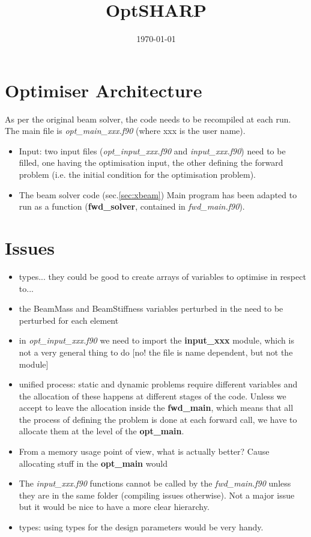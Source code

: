 \documentclass[a4paper,10pt]{article}
\title{OptSHARP}
\date{\today}
\newcommand{\bit}{\begin{itemize}}
\newcommand{\eit}{\end{itemize}}
\newcommand{\ffile}[1]{\textsl{{#1}.f90}} %
\newcommand{\ffun}[1]{\textbf{{#1}}}  %
\begin{document}
\maketitle



\section{Optimiser Architecture}
As per the original beam solver, the code needs to be recompiled at each run. The main file is \ffile{opt\_main\_xxx} (where xxx is the user name).
\bit
\item Input: two input files (\ffile{opt\_input\_xxx} and \ffile{input\_xxx}) need to be filled, one having the optimisation input, the other defining the forward problem (i.e. the initial condition for the optimisation problem).

\item The beam solver code (sec.\ref{sec:xbeam}) Main program has been adapted to run as a function (\ffun{fwd\_solver}, contained in \ffile{fwd\_main}). 


\eit



\section{Issues}
\bit
\item types... they could be good to create arrays of variables to optimise in respect to...
\item the BeamMass and BeamStiffness variables perturbed in the need to be perturbed for each element
\item in \ffile{opt\_input\_xxx} we need to import the \ffun{input\_xxx} module, which is not a very general thing to do [no! the file is name dependent, but not the module]
\item unified process: static and dynamic problems require different variables and the allocation of these happens at different stages of the code. Unless we accept to leave the allocation inside the \ffun{fwd\_main}, which means that all the process of defining the problem is done at each forward call, we have to allocate them at the level of the \ffun{opt\_main}.
\item From a memory usage point of view, what is actually better? Cause allocating stuff in the \ffun{opt\_main} would 
\item The \ffile{input\_xxx} functions cannot be called by the \ffile{fwd\_main} unless they are in the same folder (compiling issues otherwise). Not a major issue but it would be nice to have a more clear hierarchy.
\item types: using types for the design parameters would be very handy.
\eit
\end{document}
